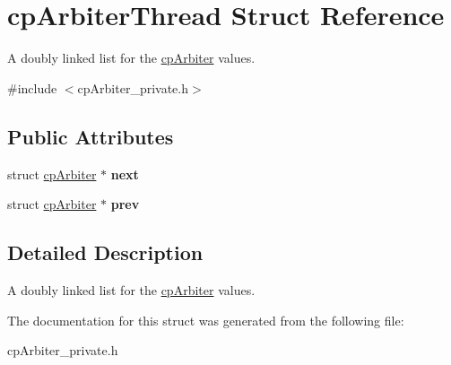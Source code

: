 \hypertarget{structcp_arbiter_thread}{}\section{cp\+Arbiter\+Thread Struct Reference}
\label{structcp_arbiter_thread}


A doubly linked list for the \hyperlink{structcp_arbiter}{cp\+Arbiter} values.  




{\ttfamily \#include $<$cp\+Arbiter\+\_\+private.\+h$>$}

\subsection*{Public Attributes}
\begin{DoxyCompactItemize}
\item 
\hypertarget{structcp_arbiter_thread_a90b8cd36d8dbd5e009f3afc80258b016}{}struct \hyperlink{structcp_arbiter}{cp\+Arbiter} $\ast$ {\bfseries next}\label{structcp_arbiter_thread_a90b8cd36d8dbd5e009f3afc80258b016}

\item 
\hypertarget{structcp_arbiter_thread_af85aac7e35c26147d4f4864a2b6f27fe}{}struct \hyperlink{structcp_arbiter}{cp\+Arbiter} $\ast$ {\bfseries prev}\label{structcp_arbiter_thread_af85aac7e35c26147d4f4864a2b6f27fe}

\end{DoxyCompactItemize}


\subsection{Detailed Description}
A doubly linked list for the \hyperlink{structcp_arbiter}{cp\+Arbiter} values. 

The documentation for this struct was generated from the following file\+:\begin{DoxyCompactItemize}
\item 
cp\+Arbiter\+\_\+private.\+h\end{DoxyCompactItemize}
